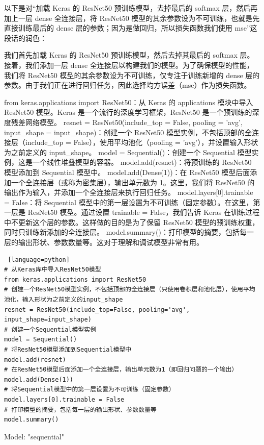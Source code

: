 \documentclass{article}
\begin{document}
以下是对“加载 Keras 的 ResNet50 预训练模型，去掉最后的 softmax 层，然后再加上一层 dense 全连接层，将 ResNet50 模型的其余参数设为不可训练，也就是先直接训练最后的 dense 层的参数；因为是做回归，所以损失函数我们使用 mse”这段话的润色：\par
我们首先加载 Keras 的 ResNet50 预训练模型，然后去掉其最后的 softmax 层。接着，我们添加一层 dense 全连接层以构建我们的模型。为了确保模型的性能，我们将 ResNet50 模型的其余参数设为不可训练，仅专注于训练新增的 dense 层的参数。由于我们正在进行回归任务，因此选择均方误差（mse）作为损失函数。\par
from keras.applications import ResNet50：从 Keras 的 applications 模块中导入 ResNet50 模型。Keras 是一个流行的深度学习框架，ResNet50 是一个预训练的深度残差网络模型。 resnet = ResNet50(include\_top = False, pooling = 'avg', input\_shape = input\_shape)：创建一个 ResNet50 模型实例，不包括顶部的全连接层（include\_top = False），使用平均池化（pooling = 'avg'），并设置输入形状为之前定义的 input\_shape。 model = Sequential()：创建一个 Sequential 模型实例，这是一个线性堆叠模型的容器。 model.add(resnet)：将预训练的 ResNet50 模型添加到 Sequential 模型中。 model.add(Dense(1))：在 ResNet50 模型后面添加一个全连接层（或称为密集层），输出单元数为 1。这里，我们将 ResNet50 的输出作为输入，并添加一个全连接层来执行回归任务。 model.layers[0].trainable = False：将 Sequential 模型中的第一层设置为不可训练（固定参数）。在这里，第一层是 ResNet50 模型。通过设置 trainable = False，我们告诉 Keras 在训练过程中不更新这个层的参数。这样做的目的是为了保留 ResNet50 模型的预训练权重，同时只训练新添加的全连接层。 model.summary()：打印模型的摘要，包括每一层的输出形状、参数数量等。这对于理解和调试模型非常有用。
\begin{lstlisting} [language=python]
# 从Keras库中导入ResNet50模型  
from keras.applications import ResNet50  
# 创建一个ResNet50模型实例，不包括顶部的全连接层（只使用卷积层和池化层），使用平均池化，输入形状为之前定义的input_shape  
resnet = ResNet50(include_top=False, pooling='avg', input_shape=input_shape)   
# 创建一个Sequential模型实例  
model = Sequential()    
# 将ResNet50模型添加到Sequential模型中  
model.add(resnet)    
# 在ResNet50模型后面添加一个全连接层，输出单元数为1（即回归问题的一个输出）  
model.add(Dense(1))   
# 将Sequential模型中的第一层设置为不可训练（固定参数）  
model.layers[0].trainable = False    
# 打印模型的摘要，包括每一层的输出形状、参数数量等  
model.summary()
\end{lstlisting}



Model: "sequential"\par
\end{document}
